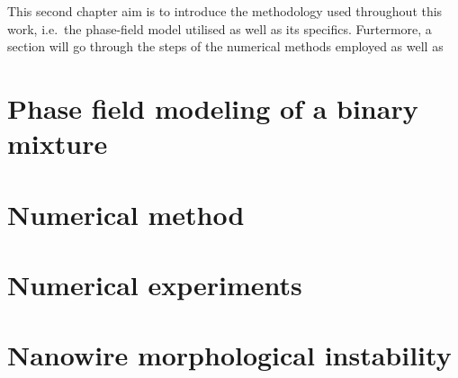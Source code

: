 This second chapter aim is to introduce the methodology used throughout this work, 
i.e.\ the phase-field model utilised as well as its specifics. Furtermore, a section will go through
the steps of the numerical methods employed as well as 
\section{Phase field modeling of a binary mixture}
    
\section{Numerical method}
    

\section{Numerical experiments}
    
\section{Nanowire morphological instability}
    
    